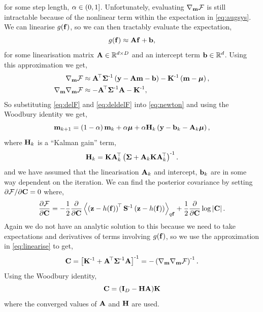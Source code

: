 \documentclass{article} %
\begin{document}
for some step length, $\step \in (0, 1]$. Unfortunately, evaluating
$\nabla_\pomean\Fengy$ is still intractable because of the nonlinear term
within the expectation in \eqref{eq:augsys}. We can linearise
$\nonlin{\lstate}$, so we can then tractably evaluate the expectation,
\begin{equation}
    \nonlin{\lstate} \approx \Linmat\lstate + \intcpt,
    \label{eq:linearise}
\end{equation}
for some linearisation matrix $\Linmat \in \real{d \times D}$ and an intercept
term $\intcpt \in \real{d}$. Using this approximation we get,
\begin{align}
    \nabla_\pomean \Fengy
        &\approx \Linmat\transpose\lcov\inv\brac{\obs - \Linmat\pomean 
            - \intcpt} - \prcov\inv\brac{\pomean - \prmean}, 
        \label{eq:delF} \\
    \nabla_\pomean \nabla_\pomean \Fengy
        &\approx - \Linmat\transpose\lcov\inv\Linmat - \prcov\inv,
        \label{eq:deldelF}
\end{align}
So substituting \eqref{eq:delF} and \eqref{eq:deldelF} into \eqref{eq:newton}
and using the Woodbury identity we get,
\begin{equation}
    \pomean_{k+1} = \brac{1-\step}\pomean_k + \step\prmean 
        + \step\Kgain_k\brac{\obs - \intcpt_k - \Linmat_k\prmean},
    \label{eq:pomean}
\end{equation}
where $\Kgain_k$ is a ``Kalman gain'' term,
\begin{equation}
    \Kgain_k = \prcov\Linmat_k\transpose\brac{\lcov +
        \Linmat_k\prcov\Linmat_k\transpose}\inv.
    \label{eq:kgain}
\end{equation}
and we have assumed that the linearisation $\Linmat_k$ and intercept,
$\intcpt_k$ are in some way dependent on the iteration. We can find the 
posterior covariance by setting $\partial\Fengy/\partial\pocov = 0$ where,
\begin{equation}
    \frac{\partial\Fengy}{\partial\pocov} = -\frac{1}{2} 
        \frac{\partial}{\partial\pocov}
        \expec{q\lstate}{
            \brac{\augobs - \augnonlin{\lstate}}\transpose\augcov\inv
            \brac{\augobs - \augnonlin{\lstate}}
    } 
    + \frac{1}{2} \frac{\partial}{\partial\pocov} \log \deter{\pocov}.
\end{equation}
Again we do not have an analytic solution to this because we need to take
expectations and derivatives of terms involving $\nonlin{\lstate}$, so we use
the approximation in \eqref{eq:linearise} to get,
\begin{equation}
    \pocov = \sbrac{\prcov\inv + \Linmat\transpose\lcov\inv\Linmat}\inv
    = - \brac{\nabla_\pomean \nabla_\pomean \Fengy}\inv.
\end{equation}
Using the Woodbury identity,
\begin{equation}
    \pocov = \brac{\ident{D} - \Kgain\Linmat}\!\prcov
    \label{eq:pocov}
\end{equation}
where the converged values of $\Linmat$ and $\Kgain$ are used.
\end{document}

